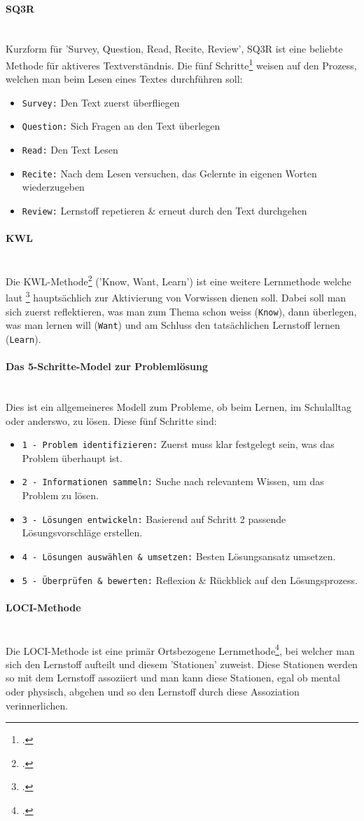 \documentclass[12pt,a4paper]{report}
\newcommand{\myparagraph}[1]{\paragraph{#1}\mbox{}\\}
\begin{document}
\myparagraph{SQ3R}
Kurzform für 'Survey, Question, Read, Recite, Review', SQ3R ist eine beliebte Methode für aktiveres Textverständnis. Die fünf Schritte\footcite{SQ3R} weisen auf den Prozess, welchen man beim Lesen eines Textes durchführen soll:
\begin{itemize}
    \item \texttt{Survey:} Den Text zuerst überfliegen
    \item \texttt{Question:} Sich Fragen an den Text überlegen
    \item \texttt{Read:} Den Text Lesen
    \item \texttt{Recite:} Nach dem Lesen versuchen, das Gelernte in eigenen Worten wiederzugeben
    \item \texttt{Review:} Lernstoff repetieren \& erneut durch den Text durchgehen
\end{itemize}

\myparagraph{KWL}
Die KWL-Methode\footcite{SQ3R} ('Know, Want, Learn') ist eine weitere Lernmethode welche laut \footcite{SQ3R} hauptsächlich zur Aktivierung von Vorwissen dienen soll. 
Dabei soll man sich zuerst reflektieren, was man zum Thema schon weiss (\texttt{Know}), dann überlegen, was man lernen will (\texttt{Want}) und am Schluss den tatsächlichen Lernstoff lernen (\texttt{Learn}).

\myparagraph{Das 5-Schritte-Model zur Problemlösung}
Dies ist ein allgemeineres Modell zum Probleme, ob beim Lernen, im Schulalltag oder anderswo, zu lösen. Diese fünf Schritte sind:
\begin{itemize}
    \item \texttt{1 - Problem identifizieren:} Zuerst muss klar festgelegt sein, was das Problem überhaupt ist.
    \item \texttt{2 - Informationen sammeln:} Suche nach relevantem Wissen, um das Problem zu lösen.
    \item \texttt{3 - Lösungen entwickeln:} Basierend auf Schritt 2 passende Lösungsvorschläge erstellen.
    \item \texttt{4 - Lösungen auswählen \& umsetzen:} Besten Lösungsansatz umsetzen.
    \item \texttt{5 - Überprüfen \& bewerten:} Reflexion \& Rückblick auf den Lösungsprozess.
\end{itemize}

\myparagraph{LOCI-Methode}
Die LOCI-Methode ist eine primär Ortsbezogene Lernmethode\footcite{SQ3R}, bei welcher man sich den Lernstoff aufteilt und diesem 'Stationen' zuweist.
Diese Stationen werden so mit dem Lernstoff assoziiert und man kann diese Stationen, egal ob mental oder physisch, abgehen und so den Lernstoff durch diese Assoziation verinnerlichen.
\end{document}

